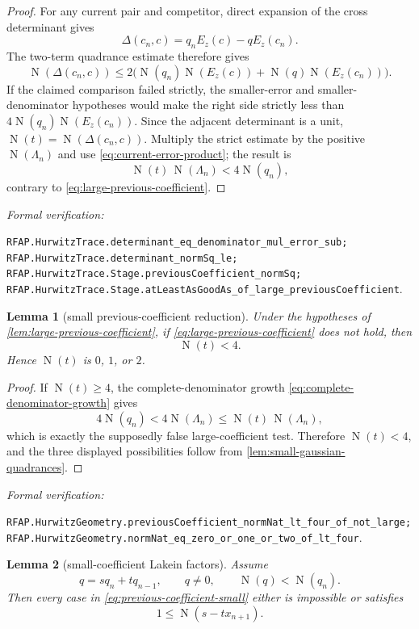\documentclass[11pt]{article}
\newtheorem{lemma}[lemma]{Lemma}
\newcommand{\Norm}[1]{\operatorname{N}\!\left(#1\right)}
\newcommand{\leanref}[1]{\par\smallskip\noindent
  \emph{Formal verification:}\par\nobreak
  {\raggedright\nolinkurl{#1}.\par}}
\begin{document}
\begin{proof}
For any current pair and competitor, direct expansion of the cross
determinant gives
\[
 \Delta(c_n,c)=q_nE_z(c)-qE_z(c_n).
\]
The two-term quadrance estimate therefore gives
\begin{equation}
\label{eq:determinant-error-bound}
 \Norm{\Delta(c_n,c)}
 \le2\bigl(\Norm{q_n}\Norm{E_z(c)}
           +\Norm q\Norm{E_z(c_n)}\bigr).
\end{equation}
If the claimed comparison failed strictly, the smaller-error and
smaller-denominator hypotheses would make the right side strictly less than
$4\Norm{q_n}\Norm{E_z(c_n)}$.  Since the adjacent determinant is a unit,
$\Norm t=\Norm{\Delta(c_n,c)}$.  Multiply the strict estimate by the positive
$\Norm{\Lambda_n}$ and use
\eqref{eq:current-error-product}; the result is
\[
                 \Norm t\,\Norm{\Lambda_n}<4\Norm{q_n},
\]
contrary to \eqref{eq:large-previous-coefficient}.
\end{proof}

\leanref{RFAP.HurwitzTrace.determinant_eq_denominator_mul_error_sub;
RFAP.HurwitzTrace.determinant_normSq_le;
RFAP.HurwitzTrace.Stage.previousCoefficient_normSq;
RFAP.HurwitzTrace.Stage.atLeastAsGoodAs_of_large_previousCoefficient}

\begin{lemma}[small previous-coefficient reduction]
\label{lem:small-previous-coefficient}
Under the hypotheses of \cref{lem:large-previous-coefficient}, if
\eqref{eq:large-previous-coefficient} does not hold, then
\begin{equation}
\label{eq:previous-coefficient-small}
                              \Norm t<4.
\end{equation}
Hence $\Norm t$ is $0$, $1$, or $2$.
\end{lemma}

\begin{proof}
If $\Norm t\ge4$, the complete-denominator growth
\eqref{eq:complete-denominator-growth} gives
\[
 4\Norm{q_n}<4\Norm{\Lambda_n}
             \le\Norm t\,\Norm{\Lambda_n},
\]
which is exactly the supposedly false large-coefficient test.  Therefore
$\Norm t<4$, and the three displayed possibilities follow from
\cref{lem:small-gaussian-quadrances}.
\end{proof}

\leanref{RFAP.HurwitzGeometry.previousCoefficient_normNat_lt_four_of_not_large;
RFAP.HurwitzGeometry.normNat_eq_zero_or_one_or_two_of_lt_four}

\begin{lemma}[small-coefficient Lakein factors]
\label{lem:small-coefficient-factors}
Assume
\begin{equation}
\label{eq:competitor-denominator-combination}
        q=sq_n+tq_{n-1},\qquad q\ne0,\qquad \Norm q<\Norm{q_n}.
\end{equation}
Then every case in \eqref{eq:previous-coefficient-small} either is
impossible or satisfies
\begin{equation}
\label{eq:small-factor-exterior}
                         1\le\Norm{s-tx_{n+1}}.
\end{equation}
\end{lemma}
\end{document}
